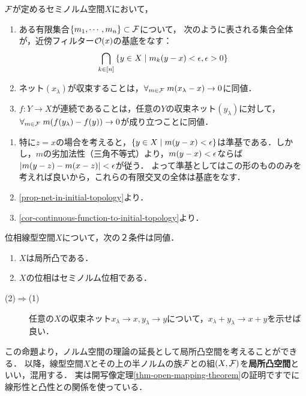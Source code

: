 \documentclass[uplatex,dvipdfmx]{jsreport}
\begin{document}
\begin{lemma}[セミノルム位相の性質]
    $\mathcal{F}$が定めるセミノルム空間$X$において，
    \begin{enumerate}
        \item ある有限集合$\{m_1,\cdots,m_n\}\subset\mathcal{F}$について，
        次のように表される集合全体が，近傍フィルター$\mathcal{O}(x)$の基底をなす：
        \[\bigcap_{k\in[n]}\left\{y\in X\mid m_k(y-x)<\epsilon,\epsilon>0\right\}\]
        \item ネット$(x_\lambda)$が収束することは，$\forall_{m\in\mathcal{F}}\;m(x_\lambda-x)\to0$に同値．
        \item $f:Y\to X$が連続であることは，任意の$Y$の収束ネット$(y_\lambda)$に対して，$\forall_{m\in\mathcal{F}}\;m(f(y_\lambda)-f(y))\to 0$が成り立つことに同値．
    \end{enumerate}
\end{lemma}
\begin{Proof}\mbox{}
    \begin{enumerate}
        \item 特に$z=x$の場合を考えると，$\{y\in X\mid m(y-x)<\epsilon\}$は準基である．しかし，$m$の劣加法性（三角不等式）より，$m(y-x)<\epsilon$ならば$\lvert m(y-z)-m(x-z)\rvert<\epsilon$が従う．
        よって準基としてはこの形のもののみを考えれば良いから，これらの有限交叉の全体は基底をなす．
        \item \ref{prop-net-in-initial-topology}より．
        \item \ref{cor-continuous-function-to-initial-topology}より．
    \end{enumerate}
\end{Proof}

\begin{proposition}[局所凸性の特徴付け]\label{prop-characterization-of-locally-convex-spaces}
    位相線型空間$X$について，次の２条件は同値．
    \begin{enumerate}
        \item $X$は局所凸である．
        \item $X$の位相はセミノルム位相である．
    \end{enumerate}
\end{proposition}
\begin{Proof}\mbox{}
    \begin{description}
        \item[(2)$\Rightarrow$(1)] 任意の$X$の収束ネット$x_\lambda\to x,y_\lambda\to y$について，$x_\lambda+y_\lambda\to x+y$を示せば良い．
    \end{description}
\end{Proof}
\begin{remarks}
    この命題より，ノルム空間の理論の延長として局所凸空間を考えることができる．
    以降，線型空間$X$とその上の半ノルムの族$\mathcal{F}$との組$(X,\mathcal{F})$を\textbf{局所凸空間}といい，混用する．
    実は開写像定理\ref{thm-open-mapping-theorem}の証明ですでに線形性と凸性との関係を使っている．
\end{remarks}
\end{document}
